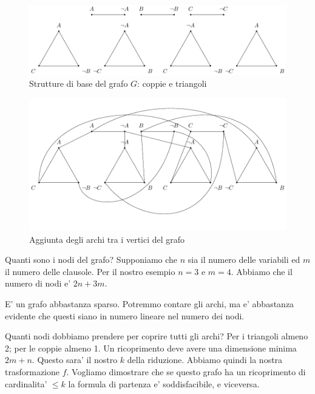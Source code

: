 \begin{figure}[h]
    \begin{center}
        \includegraphics[scale=0.75]{./img/NPClass/SATtoVC1.pdf}
        \caption{Strutture di base del grafo $G$: coppie e triangoli}
        \label{img:SATtoVC1}
    \end{center}
\end{figure}

\begin{figure}[h]
    \begin{center}
        \includegraphics[scale=0.75]{./img/NPClass/SATtoVC2.pdf}
        \caption{Aggiunta degli archi tra i vertici del grafo}
        \label{img:SATtoVC2}
    \end{center}
\end{figure}

Quanti sono i nodi del grafo? Supponiamo che $n$ sia il numero delle variabili ed $m$ il numero
delle clausole. Per il nostro esempio $n=3$ e $m=4$. Abbiamo che il numero di nodi e' $2n + 3m$.

E' un grafo abbastanza sparso. Potremmo contare gli archi, ma e' abbastanza evidente che questi
siano in numero lineare nel numero dei nodi.

Quanti nodi dobbiamo prendere per coprire tutti gli archi? Per i triangoli almeno 2; per le coppie
almeno 1. Un ricoprimento deve avere una dimensione minima $2m + n$. Questo sara' il nostro $k$
della riduzione. Abbiamo quindi la nostra trasformazione $f$. Vogliamo dimostrare che se questo
grafo ha un ricoprimento di cardinalita' $\leq k$ la formula di partenza e' soddisfacibile, e
viceversa.

